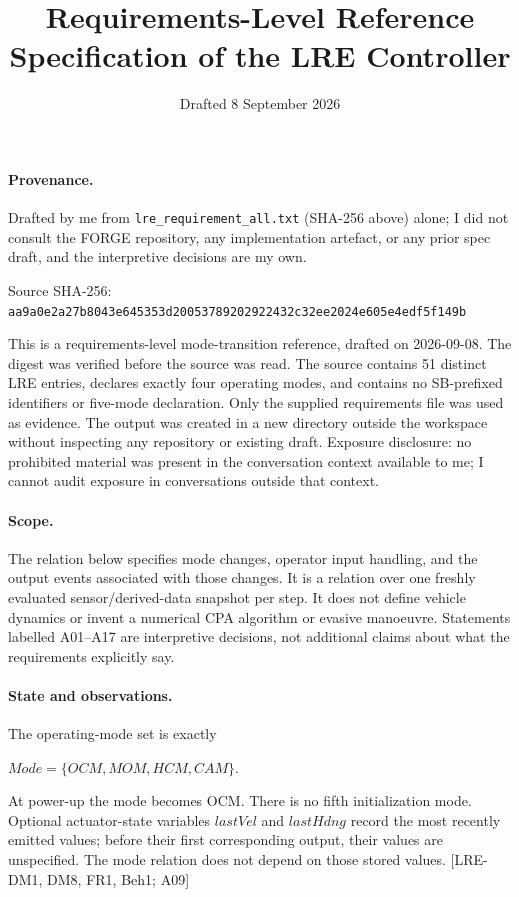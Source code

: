 \documentclass[10pt,a4paper]{article}
\title{Requirements-Level Reference Specification of the LRE Controller}
\author{}
\date{Drafted 8 September 2026}
\begin{document}
\maketitle
\paragraph{Provenance.} Drafted by me from \texttt{lre\_requirement\_all.txt} (SHA-256 above) alone; I did not consult the FORGE repository, any implementation artefact, or any prior spec draft, and the interpretive decisions are my own.

Source SHA-256: \texttt{aa9a0e2a27b8043e645353d20053789202922432c32ee2024e605e4edf5f149b}

This is a requirements-level mode-transition reference, drafted on 2026-09-08. The digest was verified before the source was read. The source contains 51 distinct LRE entries, declares exactly four operating modes, and contains no SB-prefixed identifiers or five-mode declaration. Only the supplied requirements file was used as evidence. The output was created in a new directory outside the workspace without inspecting any repository or existing draft. Exposure disclosure: no prohibited material was present in the conversation context available to me; I cannot audit exposure in conversations outside that context.

\paragraph{Scope.} The relation below specifies mode changes, operator input handling, and the output events associated with those changes. It is a relation over one freshly evaluated sensor/derived-data snapshot per step. It does not define vehicle dynamics or invent a numerical CPA algorithm or evasive manoeuvre. Statements labelled A01--A17 are interpretive decisions, not additional claims about what the requirements explicitly say.

\paragraph{State and observations.} The operating-mode set is exactly

$\mathit{Mode} = \{\mathit{OCM}, \mathit{MOM}, \mathit{HCM}, \mathit{CAM}\}$.

At power-up the mode becomes OCM. There is no fifth initialization mode. Optional actuator-state variables $\mathit{lastVel}$ and $\mathit{lastHdng}$ record the most recently emitted values; before their first corresponding output, their values are unspecified. The mode relation does not depend on those stored values. [LRE-DM1, DM8, FR1, Beh1; A09]
\end{document}
